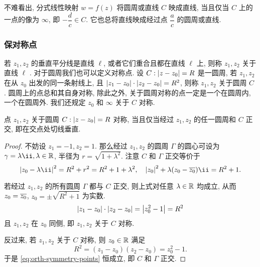 不难看出, 分式线性映射 $w=f(z)$ 将圆周或直线 $C$ 映成直线, 当且仅当 $C$ 上的一点的像为 $\infty$, 即 $-\dfrac dc\in C$.
它也总将直线映成经过点 $\dfrac ac$ 的圆周或直线.


\subsubsection{保对称点}

若 $z_1,z_2$ 的垂直平分线是直线 $\ell$, 或者它们重合且都在直线 $\ell$ 上, 则称 $z_1,z_2$ 关于直线 $\ell$ .
对于圆周我们也可以定义对称点.
设 $C:\left|z-z_0\right|=R$ 是一圆周, 若 $z_1,z_2$ 在从 $z_0$ 出发的同一条射线上, 且 $\left|z_1-z_0\right|\cdot\left|z_2-z_0\right|=R^2$, 则称 $z_1,z_2$ 关于圆周 $C$ .
圆周上的点总和其自身对称, 除此之外, 关于圆周对称的点一定是一个在圆周内, 一个在圆周外.
我们还规定 $z_0$ 和 $\infty$ 关于 $C$ 对称.

\begin{lemma}
  \label{lem:symmetry-circle}
  点 $z_1,z_2$ 关于圆周 $C:\left|z-z_0\right|=R$ 对称, 当且仅当经过 $z_1,z_2$ 的任一圆周和 $C$ 正交, 即在交点处切线垂直.
\end{lemma}

\begin{proof}
  不妨设 $z_1=-1,z_2=1$.
  那么经过 $z_1,z_2$ 的圆周 $\Gamma$ 的圆心可设为 $\gamma=\lambda\ii,\lambda\in\BR$, 半径为 $r=\sqrt{1+\lambda^2}$.
  注意 $C$ 和 $\Gamma$ 正交等价于
  \begin{equation}
    \label{eq:orth-symmetry-points}
     \abs{z_0-\lambda\ii}^2
    =R^2+r^2
    =R^2+1+\lambda^2,\quad
     \abs{z_0}^2+\lambda(z_0-\ov{z_0})\ii
    =R^2+1.
  \end{equation}

  若经过 $z_1,z_2$ 的所有圆周 $\Gamma$ 都与 $C$ 正交, 则上式对任意 $\lambda\in{\mathbb{R}}$ 均成立, 从而 $z_0=\overline{z_0}$, $z_0=\pm\sqrt{R^2+1}$ 为实数.
  \[
    \left|z_1-z_0\right|\cdot\left|z_2-z_0\right|=\left|z_0^2-1\right|=R^2
  \]
  且 $z_1,z_2$ 在 $z_0$ 同侧, 即 $z_1,z_2$ 关于 $C$ 对称.

  反过来, 若 $z_1,z_2$ 关于 $C$ 对称, 则 $z_0\in{\mathbb{R}}$ 满足
  \[
    R^2=(z_1-z_0)(z_2-z_0)=z_0^2-1.
  \]
  于是 \ref{eq:orth-symmetry-points} 恒成立, 即 $C$ 和 $\Gamma$ 正交.
\end{proof}

